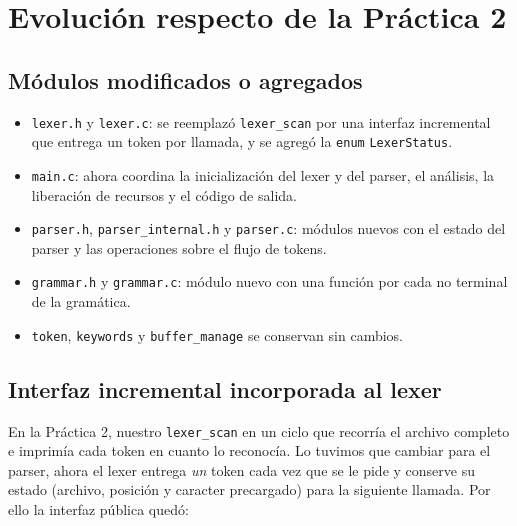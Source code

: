 \documentclass[12pt,letterpaper]{article}
\begin{document}
\bigskip


\section*{Evolución respecto de la Práctica 2}

\subsection*{Módulos modificados o agregados}

\begin{itemize}
\item \texttt{lexer.h} y \texttt{lexer.c}: se reemplazó \texttt{lexer\_scan} por una interfaz incremental
  que entrega un token por llamada, y se agregó la \texttt{enum} \texttt{LexerStatus}.
\item \texttt{main.c}: ahora coordina la inicialización del lexer y del parser, el análisis, la liberación de
  recursos y el código de salida.
\item \texttt{parser.h}, \texttt{parser\_internal.h} y \texttt{parser.c}: módulos nuevos con el estado del
  parser y las operaciones sobre el flujo de tokens.
\item \texttt{grammar.h} y \texttt{grammar.c}: módulo nuevo con una función por cada no terminal de la
  gramática.
\item \texttt{token}, \texttt{keywords} y \texttt{buffer\_manage} se conservan sin cambios.
\end{itemize}

\subsection*{Interfaz incremental incorporada al lexer}

En la Práctica 2, nuestro \texttt{lexer\_scan} en un ciclo que recorría el archivo completo e imprimía cada
token en cuanto lo reconocía. Lo tuvimos que cambiar para el parser, ahora el lexer entrega \emph{un} token cada
vez que se le pide y conserve su estado (archivo, posición y caracter precargado) para la siguiente llamada.
Por ello la interfaz pública quedó:
\end{document}
